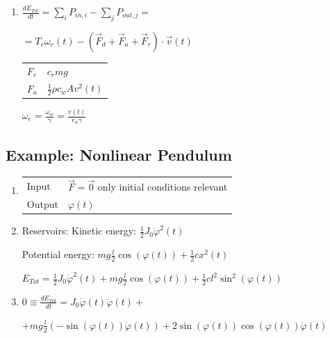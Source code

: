 \documentclass[10pt,a4paper]{scrartcl}
\begin{document}
\begin{multicols*}{3}
\begin{enumerate}

\item $\frac{dE_{Tot}}{dt}=\sum\limits_iP_{in,i}-\sum\limits_jP_{out,j}=$

$=T_e\omega_e(t)-\left(\vec{F}_d+\vec{F}_a+\vec{F}_r\right)\cdot \vec{v}(t)$

\begin{tabular}{l@{ = }l}
$F_r$&$c_rmg$\\
$F_a$&$\frac{1}{2}\rho c_w A v^2(t)$
\end{tabular}\hfill $\omega_e=\frac{\omega_w}{\gamma}=\frac{v(t)}{r_w\gamma}$


\end{enumerate}



\subsection{Example: Nonlinear Pendulum}


\begin{enumerate}
\item \begin{tabular}{ll}Input & $\vec{F}=\vec{0}$ only initial conditions relevant\\Output & $\varphi(t)$ \end{tabular}
\item Reservoirs: Kinetic energy: $\frac{1}{2}J_0\dot{\varphi}^2(t)$

Potential energy: $mg\frac{l}{2}\cos(\varphi(t))+\frac{1}{2}cx^2(t)$

$E_{Tot}=\frac{1}{2}J_0\dot{\varphi}^2(t)+mg\frac{l}{2}\cos(\varphi(t))+\frac{1}{2}cl^2\sin^2(\varphi(t))$

\item $0\equiv\frac{dE_{Tot}}{dt}=J_0\dot{\varphi}(t)\ddot{\varphi}(t)+$ 

$+mg\frac{l}{2}\left(-\sin(\varphi(t))\dot{\varphi}(t)\right)+2\sin(\varphi(t))\cos(\varphi(t))\dot{\varphi}(t)$



\end{enumerate}
\end{multicols*}
\end{document}
